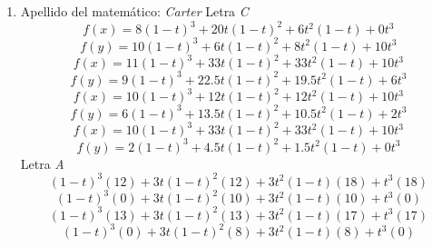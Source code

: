 \documentclass[11pt]{article}
\begin{document}
\begin{enumerate}
\item 
Apellido del matemático: \emph{Carter}
Letra \emph{C}
\begin{equation}
f(x) = 8(1-t)^3 + 20t(1-t)^2 + 6t^2(1-t)+ 0t^3 
\end{equation}
\begin{equation}
f(y) = 10(1-t)^3 + 6t(1-t)^2 + 8t^2(1-t)+ 10t^3 
\end{equation}
\begin{equation}
f(x) = 11(1-t)^3 + 33t(1-t)^2 +33t^2(1-t)+ 10t^3 
\end{equation}
\begin{equation}
f(y) = 9(1-t)^3 + 22.5t(1-t)^2 + 19.5t^2(1-t)+ 6t^3 
\end{equation}
\begin{equation}
f(x) = 10(1-t)^3 + 12t(1-t)^2 + 12t^2(1-t)+ 10t^3 
\end{equation}
\begin{equation}
f(y) = 6(1-t)^3 + 13.5t(1-t)^2 + 10.5t^2(1-t)+ 2t^3 
\end{equation}
\begin{equation}
f(x) = 10(1-t)^3 + 33t(1-t)^2 + 33t^2(1-t)+ 10t^3 
\end{equation}
\begin{equation}
f(y) = 2(1-t)^3 + 4.5t(1-t)^2 + 1.5t^2(1-t)+ 0t^3 
\end{equation}
Letra \emph{A}
\begin{equation}
(1-t)^{3}\left(12\right)+3t(1-t)^{2}\left(12\right)+3t^{2}(1-t)\left(18\right)+t^{3}\left(18\right)
\end{equation}
\begin{equation}
(1-t)^{3}\left(0\right)+3t(1-t)^{2}\left(10\right)+3t^{2}(1-t)\left(10\right)+t^{3}\left(0\right)
\end{equation}
\begin{equation}
(1-t)^{3}\left(13\right)+3t(1-t)^{2}\left(13\right)+3t^{2}(1-t)\left(17\right)+t^{3}\left(17\right)
\end{equation}
\begin{equation}
(1-t)^{3}\left(0\right)+3t(1-t)^{2}\left(8\right)+3t^{2}(1-t)\left(8\right)+t^{3}\left(0\right)
\end{equation}
\end{enumerate}
\end{document}
